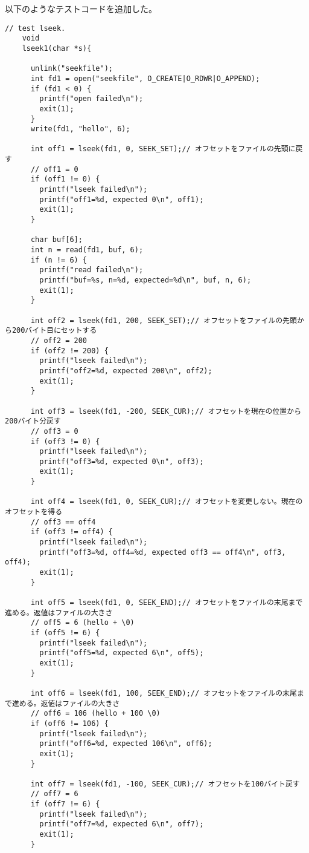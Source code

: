 \documentclass[platex,dvipdfmx, titlepage]{jlreq} %
\begin{document}
以下のようなテストコードを追加した。

\begin{lstlisting}[caption={user/usertests.c}]
    // test lseek.
    void
    lseek1(char *s){
    
      unlink("seekfile");
      int fd1 = open("seekfile", O_CREATE|O_RDWR|O_APPEND);
      if (fd1 < 0) {
        printf("open failed\n");
        exit(1);
      }
      write(fd1, "hello", 6);
    
      int off1 = lseek(fd1, 0, SEEK_SET);// オフセットをファイルの先頭に戻す
      // off1 = 0
      if (off1 != 0) {
        printf("lseek failed\n");
        printf("off1=%d, expected 0\n", off1);
        exit(1);
      }
    
      char buf[6];
      int n = read(fd1, buf, 6);
      if (n != 6) {
        printf("read failed\n");
        printf("buf=%s, n=%d, expected=%d\n", buf, n, 6);
        exit(1);
      }
    
      int off2 = lseek(fd1, 200, SEEK_SET);// オフセットをファイルの先頭から200バイト目にセットする
      // off2 = 200
      if (off2 != 200) {
        printf("lseek failed\n");
        printf("off2=%d, expected 200\n", off2);
        exit(1);
      }
    
      int off3 = lseek(fd1, -200, SEEK_CUR);// オフセットを現在の位置から200バイト分戻す
      // off3 = 0
      if (off3 != 0) {
        printf("lseek failed\n");
        printf("off3=%d, expected 0\n", off3);
        exit(1);
      }
    
      int off4 = lseek(fd1, 0, SEEK_CUR);// オフセットを変更しない。現在のオフセットを得る
      // off3 == off4
      if (off3 != off4) {
        printf("lseek failed\n");
        printf("off3=%d, off4=%d, expected off3 == off4\n", off3, off4);
        exit(1);
      }
    
      int off5 = lseek(fd1, 0, SEEK_END);// オフセットをファイルの末尾まで進める。返値はファイルの大きさ
      // off5 = 6 (hello + \0)
      if (off5 != 6) {
        printf("lseek failed\n");
        printf("off5=%d, expected 6\n", off5);
        exit(1);
      }
    
      int off6 = lseek(fd1, 100, SEEK_END);// オフセットをファイルの末尾まで進める。返値はファイルの大きさ
      // off6 = 106 (hello + 100 \0)
      if (off6 != 106) {
        printf("lseek failed\n");
        printf("off6=%d, expected 106\n", off6);
        exit(1);
      }
    
      int off7 = lseek(fd1, -100, SEEK_CUR);// オフセットを100バイト戻す
      // off7 = 6
      if (off7 != 6) {
        printf("lseek failed\n");
        printf("off7=%d, expected 6\n", off7);
        exit(1);
      }
    

\end{lstlisting}
\end{document}
